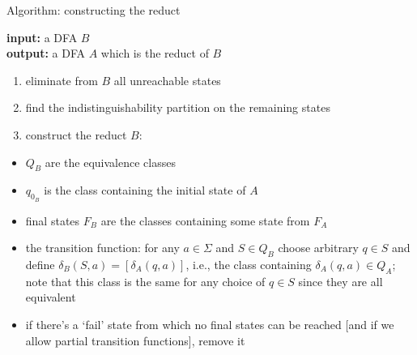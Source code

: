 \documentclass[handout]{beamer}
\begin{document}
\begin{frame}{Algorithm: constructing the reduct}
    
    \textbf{input:} a DFA $B$\\
    \textbf{output:} a DFA $A$ which is the reduct of $B$

    \begin{enumerate}
        \item eliminate from $B$ all unreachable states
        \item find the indistinguishability partition on the remaining states
        \item construct the reduct $B$:
    \end{enumerate}
    \begin{itemize}
        \item $Q_B$ are the equivalence classes
        \item $q_{0_B}$ is the class containing the initial state of $A$
        \item final states $F_B$ are the classes containing some state from $F_A$
        \item the \alert{transition function}: for any $a\in\Sigma$ and $S\in Q_B$ choose arbitrary $q\in S$ and define \alert{$\delta_B(S,a)=[\delta_A(q,a)]$}, i.e., the class containing  $\delta_A(q,a)\in Q_A$; note that this class is the same for any choice of $q\in S$ since they are all equivalent
        \item if there's a `fail' state from which no final states can be reached [and if we allow partial transition functions], remove it
    \end{itemize}

\end{frame}
\end{document}
